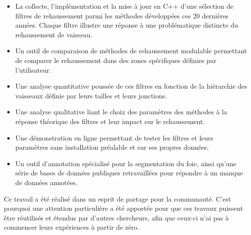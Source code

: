 \begin{itemize}
\item La collecte, l'implémentation et la mise à jour en C++ d'une sélection de filtres de rehaussement parmi les méthodes développées ces 20 dernières années. Chaque filtre illustre une réponse à une problématique distincte du rehaussement de vaisseau.
\item Un outil de comparaison de méthodes de rehaussement modulable permettant de comparer le rehaussement dans des zones spécifiques définies par l'utilisateur.
\item Une analyse quantitative poussée de ces filtres en fonction de la hiérarchie des vaisseaux définie par leurs tailles et leurs jonctions.
\item Une analyse qualitative liant le choix des paramètres des méthodes à la réponse théorique des filtres et leur impact sur le rehaussement.
\item Une démonstration en ligne permettant de tester les filtres et leurs paramètres sans installation préalable et sur ses propres données.
\item Un outil d'annotation spécialisé pour la segmentation du foie, ainsi qu'une série de bases de données publiques retravaillées pour répondre à un manque de données annotées. 
\end{itemize}

Ce travail a été réalisé dans un esprit de partage pour la communauté. C'est pourquoi une attention particulière a été apportée pour que ces travaux puissent être réutilisés et étendus par d'autres chercheurs, afin que ceux-ci n'ai pas à commencer leurs expériences à partir de zéro.

